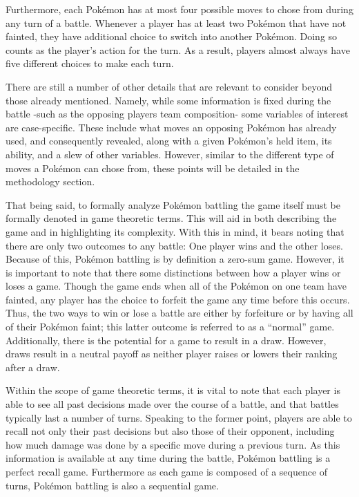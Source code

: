\documentclass[12pt,twoside]{reedthesis}
\begin{document}
  Furthermore, each Pokémon has at most four possible moves to chose from
  during any turn of a battle. Whenever a player has at least two Pokémon
  that have not fainted, they have additional choice to switch into
  another Pokémon. Doing so counts as the player's action for the turn. As
  a result, players almost always have five different choices to make each
  turn.
  
  There are still a number of other details that are relevant to consider
  beyond those already mentioned. Namely, while some information is fixed
  during the battle -such as the opposing players team composition- some
  variables of interest are case-specific. These include what moves an
  opposing Pokémon has already used, and consequently revealed, along with
  a given Pokémon's held item, its ability, and a slew of other variables.
  However, similar to the different type of moves a Pokémon can chose
  from, these points will be detailed in the methodology section.
  
  That being said, to formally analyze Pokémon battling the game itself
  must be formally denoted in game theoretic terms. This will aid in both
  describing the game and in highlighting its complexity. With this in
  mind, it bears noting that there are only two outcomes to any battle:
  One player wins and the other loses. Because of this, Pokémon battling
  is by definition a zero-sum game. However, it is important to note that
  there some distinctions between how a player wins or loses a game.
  Though the game ends when all of the Pokémon on one team have fainted,
  any player has the choice to forfeit the game any time before this
  occurs. Thus, the two ways to win or lose a battle are either by
  forfeiture or by having all of their Pokémon faint; this latter outcome
  is referred to as a ``normal'' game. Additionally, there is the
  potential for a game to result in a draw. However, draws result in a
  neutral payoff as neither player raises or lowers their ranking after a
  draw.
  
  Within the scope of game theoretic terms, it is vital to note that each
  player is able to see all past decisions made over the course of a
  battle, and that battles typically last a number of turns. Speaking to
  the former point, players are able to recall not only their past
  decisions but also those of their opponent, including how much damage
  was done by a specific move during a previous turn. As this information
  is available at any time during the battle, Pokémon battling is a
  perfect recall game. Furthermore as each game is composed of a sequence
  of turns, Pokémon battling is also a sequential game.
  
\end{document}
